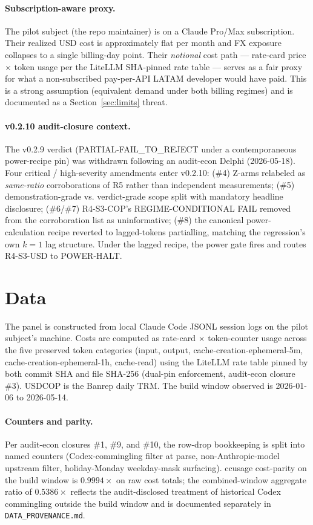 \documentclass[11pt,letterpaper]{article}
\begin{document}
\paragraph{Subscription-aware proxy.}
The pilot subject (the repo maintainer) is on a Claude Pro/Max
subscription. Their realized USD cost is approximately flat per month
and FX exposure collapses to a single billing-day point. Their
\emph{notional} cost path --- rate-card price \(\times\) token usage
per the LiteLLM SHA-pinned rate table \citep{LiteLLM2025} --- serves
as a fair proxy for what a non-subscribed pay-per-API LATAM developer
would have paid. This is a strong assumption (equivalent demand under
both billing regimes) and is documented as a Section~\ref{sec:limits}
threat.

\paragraph{v0.2.10 audit-closure context.}
The v0.2.9 verdict (PARTIAL-FAIL\_TO\_REJECT under a contemporaneous
power-recipe pin) was withdrawn following an audit-econ Delphi
(2026-05-18). Four critical / high-severity amendments enter v0.2.10:
(\#4) Z-arms relabeled as \emph{same-ratio} corroborations of R5
rather than independent measurements; (\#5) demonstration-grade vs.
verdict-grade scope split with mandatory headline disclosure; (\#6/\#7)
R4-S3-COP's REGIME-CONDITIONAL FAIL removed from the corroboration
list as uninformative; (\#8) the canonical power-calculation recipe
reverted to lagged-tokens partialling, matching the regression's own
\(k=1\) lag structure. Under the lagged recipe, the power gate fires
and routes R4-S3-USD to POWER-HALT.

\section{Data}
\label{sec:data}

The panel is constructed from local Claude Code JSONL session logs on
the pilot subject's machine. Costs are computed as rate-card
\(\times\) token-counter usage across the five preserved token
categories (input, output, cache-creation-ephemeral-5m,
cache-creation-ephemeral-1h, cache-read) using the LiteLLM rate table
pinned by both commit SHA and file SHA-256 (dual-pin enforcement,
audit-econ closure \#3). USDCOP is the Banrep daily TRM. The build
window observed is 2026-01-06 to 2026-05-14.

\paragraph{Counters and parity.}
Per audit-econ closures \#1, \#9, and \#10, the row-drop bookkeeping
is split into named counters (Codex-commingling filter at parse,
non-Anthropic-model upstream filter, holiday-Monday weekday-mask
surfacing). ccusage cost-parity on the build window is
\(0.9994\!\times\) on raw cost totals; the combined-window aggregate
ratio of \(0.5386\!\times\) reflects the audit-disclosed treatment of
historical Codex commingling outside the build window and is
documented separately in \texttt{DATA\_PROVENANCE.md}.
\end{document}
